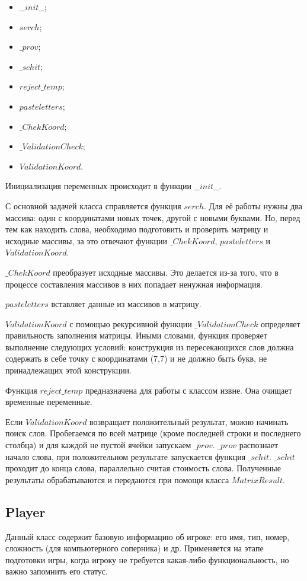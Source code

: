 \documentclass[a4paper,14pt]{article}
\begin{document}
	\begin {itemize}
		\item$\_\_init\_\_$;
		\item $serch$;
		\item $\_prov$;
		\item $\_schit$;
		\item $reject\_temp$;	
		\item $pasteletters$;
		\item $\_ChekKoord$;
		\item $\_ValidationCheck$;
		\item $ValidationKoord$.
	\end {itemize}
	
	Инициализация переменных происходит в функции $\_\_init\_\_$.
	
	С основной задачей класса справляется функция $serch$.
	Для её работы нужны два массива: один с координатами новых точек, другой с новыми буквами.
	Но, перед тем как находить слова, необходимо подготовить и проверить матрицу и исходные массивы, за это отвечают функции $\_ChekKoord$, $pasteletters$ и $ValidationKoord$.
	
	$\_ChekKoord$ преобразует исходные массивы.
	Это делается из-за того, что в процессе составления массивов в них попадает ненужная информация.
	
	$pasteletters$ вставляет данные из массивов в матрицу.
	
	$ValidationKoord$ с помощью рекурсивной функции $\_ValidationCheck$ определяет правильность заполнения матрицы.
	Иными словами, функция проверяет выполнение следующих условий: конструкция из пересекающихся слов должна содержать в себе точку с координатами (7,7) и не должно быть букв, не принадлежащих этой конструкции.
	
	Функция $reject\_temp$ предназначена для работы с классом извне.
	Она очищает временные переменные.  
	
	Если $ValidationKoord$ возвращает положительный результат, можно начинать поиск слов.
	Пробегаемся по всей матрице (кроме последней строки и последнего столбца) и для каждой не пустой ячейки запускаем $\_prov$. $\_prov$ распознает начало слова, при положительном результате запускается функция $\_schit$. $\_schit$ проходит до конца слова, параллельно считая стоимость слова.
	Полученные результаты обрабатываются и передаются при помощи класса $MatrixResult$.
	
	\subsection{Player}
	Данный класс содержит базовую информацию об игроке: его имя, тип, номер, сложность (для компьютерного соперника) и др.
	Применяется на этапе подготовки игры, когда игроку не требуется какая-либо функциональность, но важно запомнить его статус.
	
\end{document}
